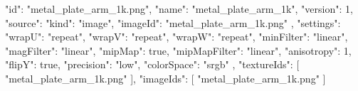 {
  "id": "metal_plate_arm_1k.png",
  "name": "metal_plate_arm_1k",
  "version": 1,
  "source": {
    "kind": "image",
    "imageId": "metal_plate_arm_1k.png"
  },
  "settings": {
    "wrapU": "repeat",
    "wrapV": "repeat",
    "wrapW": "repeat",
    "minFilter": "linear",
    "magFilter": "linear",
    "mipMap": true,
    "mipMapFilter": "linear",
    "anisotropy": 1,
    "flipY": true,
    "precision": "low",
    "colorSpace": "srgb"
  },
  "textureIds": [
    "metal_plate_arm_1k.png"
  ],
  "imageIds": [
    "metal_plate_arm_1k.png"
  ]
}
